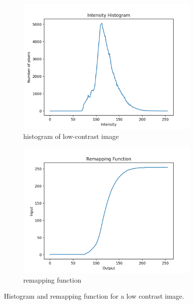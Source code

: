 \documentclass[11pt,a4paper]{article}
\begin{document}
\begin{figure}[ht]
	\centering
	\begin{subfigure}[h]{0.45\textwidth}
		\includegraphics[width=\textwidth]{figs/lc1_hist_bef}
		\caption{histogram of low-contrast image}
		\label{fig:lc1_hist_before_r}
	\end{subfigure}
	\begin{subfigure}[h]{0.45\textwidth}
		\includegraphics[width=\textwidth]{figs/lc1_remap}
		\caption{remapping function}
		\label{fig:lc1_remap}
	\end{subfigure}
	\caption{Histogram and remapping function for a low contrast image.}
	\label{fig:lc1_remap_func}
\end{figure}
\end{document}

